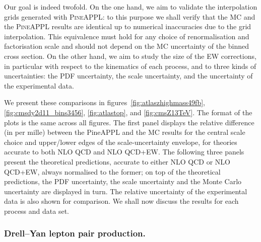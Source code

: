 Our goal is indeed twofold. On the one hand, we aim to validate the
interpolation grids generated with \textsc{PineAPPL}: to this purpose we shall
verify that the MC and the \textsc{PineAPPL} results are identical up to
numerical inaccuracies due to the grid interpolation. This equivalence must
hold for any choice of renormalisation and factorisation scale and should not
depend on the MC uncertainty of the binned cross section. On the other
hand, we aim to study the size of the EW corrections, in particular with
respect to the kinematics of each process, and to three kinds of uncertainties:
the PDF uncertainty, the scale uncertainty, and the uncertainty of the
experimental data.

We present these comparisons in
figures~\ref{fig:atlaszhighmass49fb}, \ref{fig:cmsdy2d11_bins3456}, \ref{fig:atlastop}, and \ref{fig:cmsZ13TeV}.
The format of the plots is the same across all figures. The first panel
displays the relative difference (in per mille) between the {\sc PineAPPL} and
the MC results for the central scale choice and upper/lower edges of the
scale-uncertainty envelope, for
theories accurate to both NLO QCD and NLO QCD+EW\@. The following three panels
present the theoretical predictions, accurate to either NLO QCD or NLO QCD+EW,
always normalised to the former; on top of the theoretical predictions, the
PDF uncertainty, the scale uncertainty and the Monte Carlo uncertainty are
displayed in turn. The relative uncertainty of the experimental data is
also shown for comparison. We shall now discuss the results for each
process and data set.

\subsubsection{Drell--Yan lepton pair production.}
\label{sec:dy-lepton-pair-production}

